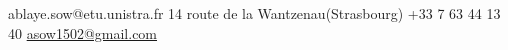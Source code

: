 \documentclass[lighthipster]{simplehipstercv}
\newlength{\rightcolwidth}
\begin{document}
\begin{paracol}{2}
\setlength{\parindent}{0pt}
\begin{minipage}[t]{\rightcolwidth}
\begin{center}\fontfamily{\sfdefault}\selectfont \color{black!70}
{\small ablaye.sow@etu.unistra.fr  14 route de la Wantzenau(Strasbourg) \newline {} +33 7 63 44 13 40  \protect\url{asow1502@gmail.com}
}
\end{center}
\end{minipage}

\end{paracol}
\end{document}
